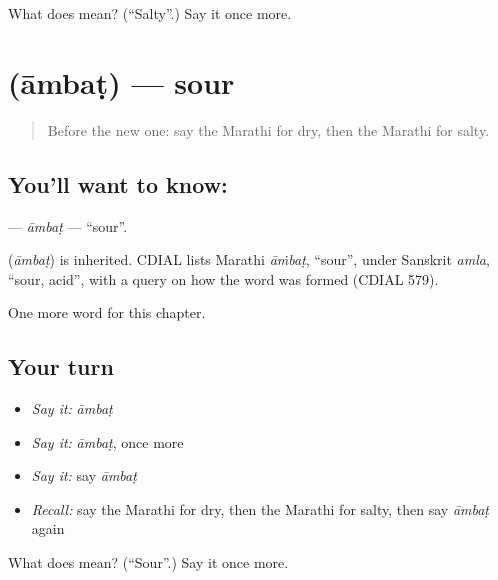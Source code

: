 \begin{tcolorbox}[breakable,colback=teal!4,colframe=teal!35!black,title={Before you move on}]
What does  mean? (\textquotedblleft{}Salty\textquotedblright{}.) Say it once more.
\end{tcolorbox}
\section[\texorpdfstring{\mr{आंबट} (āmbaṭ)}{आंबट (āmbaṭ)}]{ (āmbaṭ) — sour}

\label{lesson:MR-C149-ambat}



\begin{quote}
Before the new one: say the Marathi for dry, then the Marathi for salty.
\end{quote}

\subsection*{You'll want to know: }
\textbf{} — \emph{āmbaṭ} — \textquotedblleft{}sour\textquotedblright{}.

\begin{cousinweb}
\textbf{} (\emph{āmbaṭ}) is inherited. CDIAL lists Marathi \emph{āṁbaṭ}, \textquotedblleft{}sour\textquotedblright{}, under Sanskrit \emph{amla}, \textquotedblleft{}sour, acid\textquotedblright{}, with a query on how the word was formed (CDIAL 579).
\end{cousinweb}

\begin{grammarlens}[title={What you've built}]
One more word for this chapter.
\end{grammarlens}

\subsection*{Your turn}
\begin{itemize}
\raggedright
  \item \emph{Say it:} \emph{āmbaṭ}
  \item \emph{Say it:} \emph{āmbaṭ}, once more
  \item \emph{Say it:} say \emph{āmbaṭ}
  \item \emph{Recall:} say the Marathi for dry, then the Marathi for salty, then say \emph{āmbaṭ} again
\end{itemize}

\begin{tcolorbox}[breakable,colback=teal!4,colframe=teal!35!black,title={Before you move on}]
What does  mean? (\textquotedblleft{}Sour\textquotedblright{}.) Say it once more.
\end{tcolorbox}
